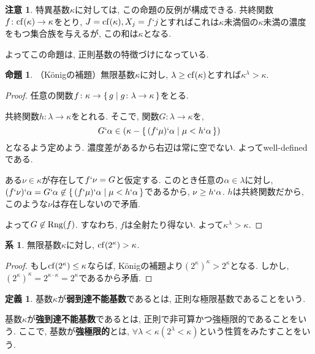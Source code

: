 \documentclass[a4paper, twoside]{bxjsarticle}
\theoremstyle{definition}
\newtheorem{prop}[thm]{命題}
\newtheorem{defn}[thm]{定義}
\newtheorem{cor}[thm]{系}
\newtheorem{rem}[thm]{注意}
\begin{document}
        \begin{rem}
            特異基数$\kappa$に対しては, この命題の反例が構成できる. 共終関数$f\colon{\rm cf}(\kappa)\to\kappa$をとり, $J={\rm cf}(\kappa), X_j = f`j$とすればこれは$\kappa$未満個の$\kappa$未満の濃度をもつ集合族を与えるが, この和は$\kappa$となる. 
            
            よってこの命題は, 正則基数の特徴づけになっている.
        \end{rem}
        \begin{prop}
            （Königの補題）無限基数$\kappa$に対し, $\lambda\geq{\rm cf}(\kappa)$とすれば$\kappa^\lambda > \kappa$.
        \end{prop}
        \begin{proof}
            任意の関数$f\colon \kappa\to\set{g|g\colon \lambda\to\kappa}$をとる.
            
            共終関数$h\colon \lambda\to\kappa$をとれる. そこで, 関数$G\colon\lambda\to\kappa$を, \[G`\alpha\in (\kappa-\set{(f`\mu)`\alpha|\mu<h`\alpha})\]となるよう定めよう. 濃度差があるから右辺は常に空でない. よってwell-definedである.
            
            ある$\nu\in\kappa$が存在して$f`\nu = G$と仮定する. このとき任意の$\alpha\in\lambda$に対し, $(f`\nu)`\alpha=G`\alpha\not\in \set{(f`\mu)`\alpha|\mu<h`\alpha}$であるから, $\nu\geq h`\alpha$. $h$は共終関数だから, このような$\nu$は存在しないので矛盾.
            
            よって$G\not\in {\rm Rng}(f)$. すなわち, $f$は全射たり得ない. よって$\kappa^\lambda > \kappa$.
        \end{proof}
        \begin{cor}
            無限基数$\kappa$に対し, ${\rm cf}(2^\kappa)>\kappa$.
        \end{cor}
        \begin{proof}
            もし${\rm cf}(2^\kappa)\leq\kappa$ならば, Königの補題より$(2^\kappa)^\kappa>2^\kappa$となる. しかし, $(2^\kappa)^\kappa=2^{\kappa\cdot\kappa}=2^\kappa$であるから矛盾.
        \end{proof}
        \begin{defn}
            基数$\kappa$が\textbf{弱到達不能基数}であるとは, 正則な極限基数であることをいう.
            
            基数$\kappa$が\textbf{強到達不能基数}であるとは, 正則で非可算かつ強極限的であることをいう. ここで, 基数が\textbf{強極限的}とは, $\forall \lambda<\kappa(2^\lambda<\kappa)$という性質をみたすことをいう.
        \end{defn}
\end{document}
